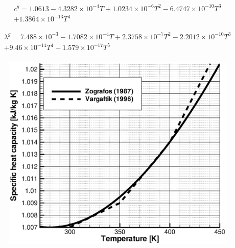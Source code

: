 \begin{eqnarray}
c^g
=
1.0613
-
4.3282 \times 10^{-4} T
+
1.0234 \times 10^{-6} T^2
-
6.4747 \times 10^{-10} T^3
\nonumber
\\
+
1.3864 \times 10^{-13} T^4
\label{eqn:heat_capacity}
\end{eqnarray}

\begin{eqnarray}
\lambda^g
=
7.488 \times 10^{-3}
-
1.7082 \times 10^{-4} T
+
2.3758 \times 10^{-7} T^2
-
2.2012 \times 10^{-10} T^3
\nonumber
\\
+
9.46 \times 10^{-14} T^4
-
1.579 \times 10^{-17} T^5
\nonumber
\\
\label{eqn:thermal_conductivity}
\end{eqnarray}

\newpage
\begin{figure}[htb!]
\includegraphics[scale=0.4]{H_GAS/figures/heat_capacity_air.eps}
\end{figure} 
